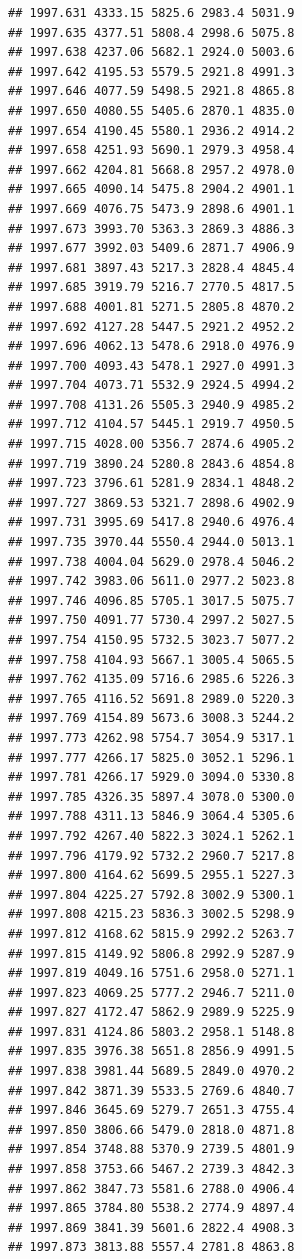\documentclass[
]{book}
\begin{document}
\begin{verbatim}
## 1997.631 4333.15 5825.6 2983.4 5031.9
## 1997.635 4377.51 5808.4 2998.6 5075.8
## 1997.638 4237.06 5682.1 2924.0 5003.6
## 1997.642 4195.53 5579.5 2921.8 4991.3
## 1997.646 4077.59 5498.5 2921.8 4865.8
## 1997.650 4080.55 5405.6 2870.1 4835.0
## 1997.654 4190.45 5580.1 2936.2 4914.2
## 1997.658 4251.93 5690.1 2979.3 4958.4
## 1997.662 4204.81 5668.8 2957.2 4978.0
## 1997.665 4090.14 5475.8 2904.2 4901.1
## 1997.669 4076.75 5473.9 2898.6 4901.1
## 1997.673 3993.70 5363.3 2869.3 4886.3
## 1997.677 3992.03 5409.6 2871.7 4906.9
## 1997.681 3897.43 5217.3 2828.4 4845.4
## 1997.685 3919.79 5216.7 2770.5 4817.5
## 1997.688 4001.81 5271.5 2805.8 4870.2
## 1997.692 4127.28 5447.5 2921.2 4952.2
## 1997.696 4062.13 5478.6 2918.0 4976.9
## 1997.700 4093.43 5478.1 2927.0 4991.3
## 1997.704 4073.71 5532.9 2924.5 4994.2
## 1997.708 4131.26 5505.3 2940.9 4985.2
## 1997.712 4104.57 5445.1 2919.7 4950.5
## 1997.715 4028.00 5356.7 2874.6 4905.2
## 1997.719 3890.24 5280.8 2843.6 4854.8
## 1997.723 3796.61 5281.9 2834.1 4848.2
## 1997.727 3869.53 5321.7 2898.6 4902.9
## 1997.731 3995.69 5417.8 2940.6 4976.4
## 1997.735 3970.44 5550.4 2944.0 5013.1
## 1997.738 4004.04 5629.0 2978.4 5046.2
## 1997.742 3983.06 5611.0 2977.2 5023.8
## 1997.746 4096.85 5705.1 3017.5 5075.7
## 1997.750 4091.77 5730.4 2997.2 5027.5
## 1997.754 4150.95 5732.5 3023.7 5077.2
## 1997.758 4104.93 5667.1 3005.4 5065.5
## 1997.762 4135.09 5716.6 2985.6 5226.3
## 1997.765 4116.52 5691.8 2989.0 5220.3
## 1997.769 4154.89 5673.6 3008.3 5244.2
## 1997.773 4262.98 5754.7 3054.9 5317.1
## 1997.777 4266.17 5825.0 3052.1 5296.1
## 1997.781 4266.17 5929.0 3094.0 5330.8
## 1997.785 4326.35 5897.4 3078.0 5300.0
## 1997.788 4311.13 5846.9 3064.4 5305.6
## 1997.792 4267.40 5822.3 3024.1 5262.1
## 1997.796 4179.92 5732.2 2960.7 5217.8
## 1997.800 4164.62 5699.5 2955.1 5227.3
## 1997.804 4225.27 5792.8 3002.9 5300.1
## 1997.808 4215.23 5836.3 3002.5 5298.9
## 1997.812 4168.62 5815.9 2992.2 5263.7
## 1997.815 4149.92 5806.8 2992.9 5287.9
## 1997.819 4049.16 5751.6 2958.0 5271.1
## 1997.823 4069.25 5777.2 2946.7 5211.0
## 1997.827 4172.47 5862.9 2989.9 5225.9
## 1997.831 4124.86 5803.2 2958.1 5148.8
## 1997.835 3976.38 5651.8 2856.9 4991.5
## 1997.838 3981.44 5689.5 2849.0 4970.2
## 1997.842 3871.39 5533.5 2769.6 4840.7
## 1997.846 3645.69 5279.7 2651.3 4755.4
## 1997.850 3806.66 5479.0 2818.0 4871.8
## 1997.854 3748.88 5370.9 2739.5 4801.9
## 1997.858 3753.66 5467.2 2739.3 4842.3
## 1997.862 3847.73 5581.6 2788.0 4906.4
## 1997.865 3784.80 5538.2 2774.9 4897.4
## 1997.869 3841.39 5601.6 2822.4 4908.3
## 1997.873 3813.88 5557.4 2781.8 4863.8

\end{verbatim}
\end{document}
